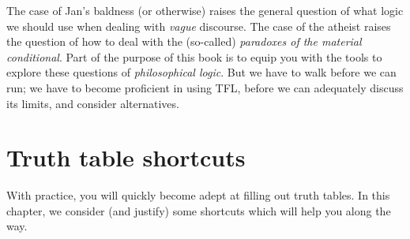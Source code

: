 The case of Jan's baldness (or otherwise) raises the general question
of what logic we should use when dealing with \emph{vague} discourse.
The case of the atheist raises the question of how to deal with the
(so-called) \emph{paradoxes of the material conditional}. Part of the
purpose of this book is to equip you with the tools to explore these
questions of \emph{philosophical logic}. But we have to walk before we
can run; we have to become proficient in using TFL, before we can
adequately discuss its limits, and consider alternatives.

\chapter{Truth table shortcuts}
With practice, you will quickly become adept at filling out truth tables. In this chapter, we consider (and justify) some shortcuts which will help you along the way.

